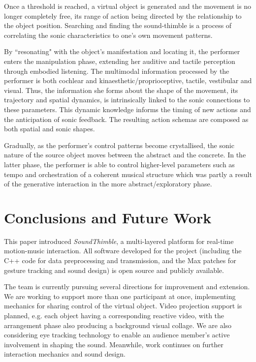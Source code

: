\documentclass{nime-alternate}
\begin{document}
Once a threshold is reached, a virtual object is generated and the movement is no longer completely free, its range of action being directed by the relationship to the object position. Searching and finding the sound-thimble is a process of correlating the sonic characteristics to one's own movement patterns.

By ``resonating" with the object's manifestation and locating it, the performer enters the manipulation phase, extending her auditive and tactile perception through embodied listening. The multimodal information processed by the performer is both cochlear and kinaesthetic/proprioceptive, tactile, vestibular and visual. Thus, the information she forms about the shape of the movement, its trajectory and spatial dynamics, is intrinsically linked to the sonic connections to these parameters. This dynamic knowledge informs the timing of new actions and the anticipation of sonic feedback. The resulting action schemas are composed as both spatial and sonic shapes.

Gradually, as the performer's control patterns become crystallised, the sonic nature of the source object moves between the abstract and the concrete. In the latter phase, the performer is able to control higher-level parameters such as tempo and orchestration of a coherent musical structure which was partly a result of the generative interaction in the more abstract/exploratory phase.



\section{Conclusions and Future Work}
\label{sec:conc}

This paper introduced \textit{SoundThimble}, a multi-layered platform for real-time motion-music interaction.
All software developed for the project (including the C++ code for data preprocessing and transmission, and the Max patches for gesture tracking and sound design) is open source and publicly available.

The team is currently pursuing several directions for improvement and extension. We are working to support more than one participant at once, implementing mechanics for sharing control of the virtual object. Video projection support is planned, e.g. each object having a corresponding reactive video, with the arrangement phase also producing a background visual collage. We are also considering eye tracking technology to enable an audience member's active involvement in shaping the sound. Meanwhile, work continues on further interaction mechanics and sound design.
\end{document}
